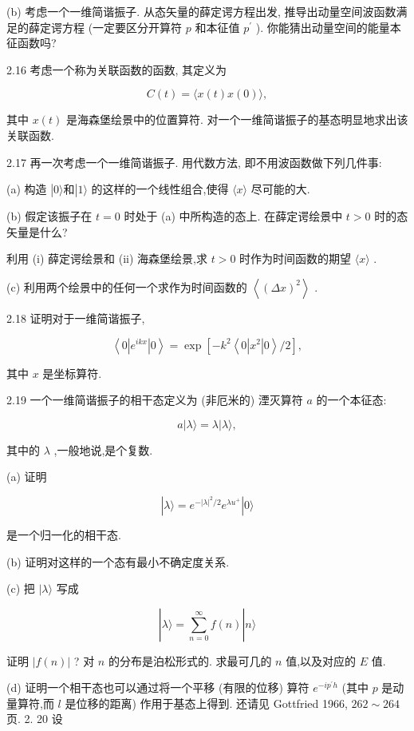 (b) 考虑一个一维简谐振子. 从态矢量的薛定谔方程出发, 推导出动量空间波函数满足的薛定谔方程 (一定要区分开算符 $p$ 和本征值 ${p}^{\prime }$ ). 你能猜出动量空间的能量本征函数吗?

2.16 考虑一个称为关联函数的函数, 其定义为

$$
C\left( t\right) = \langle x\left( t\right) x\left( 0\right) \rangle ,
$$

其中 $x\left( t\right)$ 是海森堡绘景中的位置算符. 对一个一维简谐振子的基态明显地求出该关联函数.

2.17 再一次考虑一个一维简谐振子. 用代数方法, 即不用波函数做下列几件事:

(a) 构造 $\left| {0\rangle \text{和}}\right| 1\rangle$ 的这样的一个线性组合,使得 $\langle x\rangle$ 尽可能的大.

(b) 假定该振子在 $t = 0$ 时处于 (a) 中所构造的态上. 在薛定谔绘景中 $t > 0$ 时的态矢量是什么?

利用 (i) 薛定谔绘景和 (ii) 海森堡绘景,求 $t > 0$ 时作为时间函数的期望 $\langle x\rangle$ .

(c) 利用两个绘景中的任何一个求作为时间函数的 $\left\langle {\left( \Delta x\right) }^{2}\right\rangle$ .

2.18 证明对于一维简谐振子,

$$
\left\langle {0\left| {e}^{ikx}\right| 0}\right\rangle = \exp \left\lbrack {-{k}^{2}\left\langle {0\left| {x}^{2}\right| 0}\right\rangle /2}\right\rbrack ,
$$

其中 $x$ 是坐标算符.

2.19 一个一维简谐振子的相干态定义为 (非厄米的) 湮灭算符 $a$ 的一个本征态:

$$
a\left| {\lambda \rangle = \lambda }\right| \lambda \rangle ,
$$

其中的 $\lambda$ ,一般地说,是个复数.

(a) 证明

$$
\left| {\lambda \rangle = {e}^{-{\left| \lambda \right| }^{2}/2}{e}^{\lambda {u}^{ + }}}\right| 0\rangle
$$

是一个归一化的相干态.

(b) 证明对这样的一个态有最小不确定度关系.

(c) 把 $|\lambda \rangle$ 写成

$$
\left| {\lambda \rangle = \mathop{\sum }\limits_{{n = 0}}^{\infty }f\left( n\right) }\right| n\rangle
$$

证明 $\left| {f\left( n\right) }\right|$ ? 对 $n$ 的分布是泊松形式的. 求最可几的 $n$ 值,以及对应的 $E$ 值.

(d) 证明一个相干态也可以通过将一个平移 (有限的位移) 算符 ${e}^{-i{p}^{\prime }h}$ (其中 $p$ 是动量算符,而 $l$ 是位移的距离) 作用于基态上得到. 还请见 Gottfried 1966, ${262} \sim {264}$ 页. 2. 20 设

